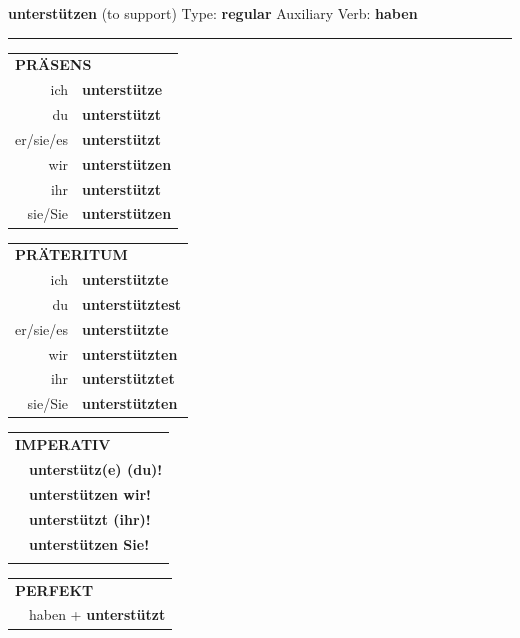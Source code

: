 \documentclass[10pt,a4paper]{revtex4-2}
\begin{document}
\begin{verbbox}
    {\Large \bf unterstützen} (to support) \hfill Type: \textbf{regular} \hfill Auxiliary Verb: \textbf{haben} 
    
     \vspace{5pt}

    \hrule
    
    \vspace{5pt}

  \begin{tabular}{rl}
     \multicolumn{2}{l}{\textbf{PRÄSENS} }\\
    ich & \textbf{unterstütze}\\
    du & \textbf{unterstützt}\\
    er/sie/es & \textbf{unterstützt}\\
    wir & \textbf{unterstützen}\\
    ihr & \textbf{unterstützt}\\
    sie/Sie & \textbf{unterstützen}\\
  \end{tabular}
  \hfill
     \begin{tabular}{rl}
    \multicolumn{2}{l}{\textbf{PRÄTERITUM} }\\
    ich & \textbf{unterstützte}\\
    du & \textbf{unterstütztest}\\
    er/sie/es & \textbf{unterstützte}\\
    wir & \textbf{unterstützten}\\
    ihr & \textbf{unterstütztet}\\
    sie/Sie & \textbf{unterstützten}\\
  \end{tabular}
  \hfill
  \begin{tabular}{rl}
     \multicolumn{2}{l}{\textbf{IMPERATIV} }\\
   & \textbf{unterstütz(e) (du)!}\\
   & \textbf{unterstützen wir!}\\
   & \textbf{unterstützt (ihr)!}\\
   & \textbf{unterstützen Sie!}\\
   & \vspace{10pt}
  \end{tabular}

    \vspace{10pt}

 \begin{tabular}{rl}
     \multicolumn{2}{l}{\textbf{PERFEKT}}\\
   & haben + \textbf{unterstützt}\\
  \end{tabular}
\hfill
   \begin{tabular}{rl}
   

\end{tabular}
\end{verbbox}
\end{document}
